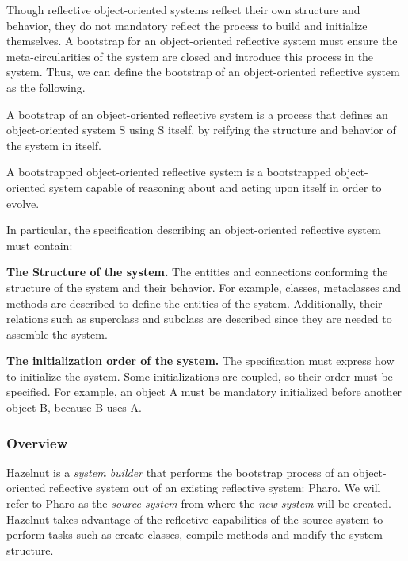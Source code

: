 Though reflective object-oriented systems reflect their own structure and behavior, they do not mandatory reflect the process to build and initialize themselves.
A bootstrap for an object-oriented reflective system must ensure the meta-circularities of the system are closed and introduce this process in the system.
Thus, we can define the bootstrap of an object-oriented reflective system as the following.

\begin{definition}
A bootstrap of an object-oriented reflective system is a process that defines an object-oriented system S using S itself, by reifying the structure and behavior of the system in itself.
\end{definition}

\begin{definition}
A bootstrapped object-oriented reflective system is a bootstrapped object-oriented system capable of reasoning about and acting upon itself in order to evolve.
\end{definition}

In particular, the specification describing an object-oriented reflective system must contain:
\begin{description}
\item \textbf{The Structure of the system.}
The entities and connections conforming the structure of the system and their behavior.
For example, classes, metaclasses and methods are described to define the entities of the system. Additionally, their relations such as superclass and subclass are described since they are needed to assemble the system.

\item \textbf{The initialization order of the system.}
The specification must express how to initialize the system.
Some initializations are coupled, so their order must be specified.
For example, an object A must be mandatory initialized before another object B, because B uses A.
\end{description}

\subsubsection{Overview}
Hazelnut is a \emph{system builder} that performs the bootstrap process of an object-oriented reflective system out of an existing reflective system: Pharo.
We will refer to Pharo as the \emph{source system} from where the \emph{new system} will be created.
Hazelnut takes advantage of the reflective capabilities of the source system to perform tasks such as create classes, compile methods and modify the system structure.

